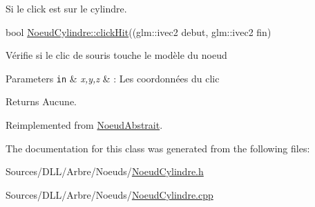 Si le click est sur le cylindre. 

bool \hyperlink{class_noeud_cylindre_a6dd083ca619c9ff7977d3a0878732519}{Noeud\+Cylindre\+::click\+Hit}((glm\+::ivec2 debut, glm\+::ivec2 fin)

Vérifie si le clic de souris touche le modèle du noeud


\begin{DoxyParams}[1]{Parameters}
\mbox{\tt in}  & {\em x,y,z} & \+: Les coordonnées du clic\\
\hline
\end{DoxyParams}
\begin{DoxyReturn}{Returns}
Aucune. 
\end{DoxyReturn}


Reimplemented from \hyperlink{group__inf2990_gad1d1a9c6adcedfcd5eda6c6d4e67a50f}{Noeud\+Abstrait}.



The documentation for this class was generated from the following files\+:\begin{DoxyCompactItemize}
\item 
Sources/\+D\+L\+L/\+Arbre/\+Noeuds/\hyperlink{_noeud_cylindre_8h}{Noeud\+Cylindre.\+h}\item 
Sources/\+D\+L\+L/\+Arbre/\+Noeuds/\hyperlink{_noeud_cylindre_8cpp}{Noeud\+Cylindre.\+cpp}\end{DoxyCompactItemize}
